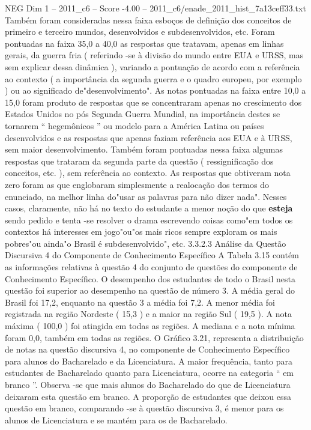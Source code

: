 \begin{textsample}{NEG Dim 1 – 2011\_c6 – Score -4.00 – 2011\_c6/enade\_2011\_hist\_7a13ceff33.txt}
Também foram consideradas nessa faixa esboços de definição dos conceitos de primeiro e terceiro mundos, desenvolvidos e subdesenvolvidos, etc.
Foram pontuadas na faixa 35,0 a 40,0 as respostas que tratavam, apenas em linhas gerais, da guerra fria ( referindo -se à divisão do mundo entre EUA e URSS, mas sem explicar dessa dinâmica ), variando a pontuação de acordo com a referência ao contexto ( a importância da segunda guerra e o quadro europeu, por exemplo ) ou ao significado de"desenvolvimento".
As notas pontuadas na faixa entre 10,0 a 15,0 foram produto de respostas que se concentraram apenas no crescimento dos Estados Unidos no pós Segunda Guerra Mundial, na importância destes se tornarem “ hegemônicos ” ou modelo para a América Latina ou países desenvolvidos e as respostas que apenas faziam referência aos EUA e à URSS, sem maior desenvolvimento.
Também foram pontuadas nessa faixa algumas respostas que trataram da segunda parte da questão ( ressignificação dos conceitos, etc. ), sem referência ao contexto.
As respostas que obtiveram nota zero foram as que englobaram simplesmente a realocação dos termos do enunciado, na melhor linha do"usar as palavras para não dizer nada".
Nesses casos, claramente, não há no texto do estudante a menor noção do que \textbf{esteja} sendo pedido e tenta -se resolver o drama escrevendo coisas como"em todos os contextos há interesses em jogo"ou"os mais ricos sempre exploram os mais pobres"ou ainda"o Brasil é subdesenvolvido", etc. 3.3.2.3 Análise da Questão Discursiva 4 do Componente de Conhecimento Específico A Tabela 3.15 contém as informações relativas à questão 4 do conjunto de questões do componente de Conhecimento Específico.
O desempenho dos estudantes de todo o Brasil nesta questão foi superior ao desempenho na questão de número 3.
A média geral do Brasil foi 17,2, enquanto na questão 3 a média foi 7,2.
A menor média foi registrada na região Nordeste ( 15,3 ) e a maior na região Sul ( 19,5 ).
A nota máxima ( 100,0 ) foi atingida em todas as regiões.
A mediana e a nota mínima foram 0,0, também em todas as regiões.
O Gráfico 3.21, representa a distribuição de notas na questão discursiva 4, no componente de Conhecimento Específico para alunos do Bacharelado e da Licenciatura.
A maior frequência, tanto para estudantes de Bacharelado quanto para Licenciatura, ocorre na categoria “ em branco ”.
Observa -se que mais alunos do Bacharelado do que de Licenciatura deixaram esta questão em branco.
A proporção de estudantes que deixou essa questão em branco, comparando -se à questão discursiva 3, é menor para os alunos de Licenciatura e se mantém para os de Bacharelado.

\end{textsample}
